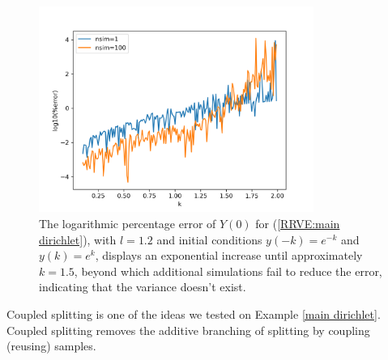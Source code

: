 \documentclass[a4paper,12pt]{article}
\begin{document}
\begin{figure}[h!]
  \centering
  \includegraphics[width=0.8\textwidth]{plots/mainD explosion.png}
  \caption{The logarithmic percentage error of $Y(0)$ for
  (\ref{RRVE:main dirichlet}), with $l=1.2$ and initial conditions
  $y(-k)=e^{-k}$ and $y(k)=e^{k}$, displays an exponential
  increase until approximately $k=1.5$, beyond which additional
  simulations fail to reduce the error, indicating that the variance
  doesn't exist.}
  \label{fig:mainD explosion}
\end{figure}

Coupled splitting is one of the ideas we tested on Example \ref{main dirichlet}.
Coupled splitting removes the additive branching of splitting by coupling (reusing)
samples.
\end{document}
